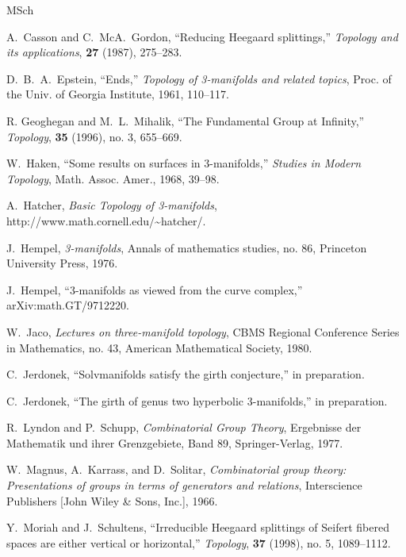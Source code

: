 \begin{thebibliography}{MSch}

 A.~Casson and C.~McA.~Gordon, ``Reducing Heegaard
splittings,'' {\em Topology and its applications}, {\bf 27} (1987), 
275--283.


 D.~B.~A.~Epstein, ``Ends,'' 
{\em Topology of 3-manifolds and related topics}, 
Proc. of the Univ. of Georgia Institute, 1961, 110--117.

 R. Geoghegan and M.~L.~Mihalik, ``The Fundamental Group at Infinity,'' {\em Topology}, {\bf 35} (1996), no. 3, 655--669.

 W.~Haken, ``Some results on surfaces in $3$-manifolds,''
{\em Studies in Modern Topology}, Math. Assoc. Amer., 1968, 39--98.

 A.~Hatcher, {\em Basic Topology of 3-manifolds},
http://www.math.cornell.edu/\~{ }hatcher/.

 J.~Hempel, {\em 3-manifolds}, Annals of 
mathematics studies, no. 86, Princeton University Press, 1976.

 J.~Hempel, ``3-manifolds as viewed from the curve
complex,'' arXiv:math.GT/9712220.

 W.~Jaco, {\em Lectures on three-manifold
topology}, CBMS Regional Conference Series in Mathematics, no. 43,
American Mathematical Society, 1980.

 C.~Jerdonek, ``Solvmanifolds satisfy the
girth conjecture,'' in preparation.

 C.~Jerdonek, ``The girth of genus two hyperbolic 
3-manifolds,'' in preparation.

 R.~Lyndon and P.~Schupp, {\em Combinatorial 
Group Theory}, Ergebnisse der Mathematik und ihrer Grenzgebiete, 
Band 89, Springer-Verlag, 1977.

 W.~Magnus, A.~Karrass, and D.~Solitar,
{\em  Combinatorial group theory: Presentations of groups in terms 
of generators and relations}, Interscience Publishers 
[John Wiley \& Sons, Inc.], 1966.

 Y.~Moriah and J.~Schultens, ``Irreducible 
Heegaard splittings of Seifert fibered spaces are either vertical or
horizontal,'' {\em Topology}, {\bf 37} (1998), no. 5, 1089--1112.


\end{thebibliography}
